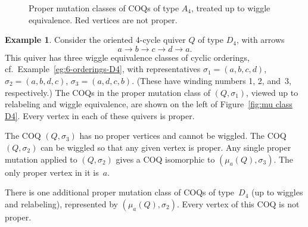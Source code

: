 \documentclass[11pt, letterpaper]{amsart}
\theoremstyle{definition}
\newtheorem{example}[theorem]{Example}
\numberwithin{equation}{section}
\begin{document}
\begin{figure}[ht]
{
}
\vspace{10pt}
\caption{Proper mutation classes of COQs of type $A_4$, treated up to wiggle equivalence. 
Red vertices are not proper.}
\label{fig:mu class A4}
\end{figure}

\vspace{-10pt}

\begin{example}
\label{eg:D4}
Consider the oriented 4-cycle quiver $Q$ of type $D_4$, with arrows 
\begin{equation*}
a \rightarrow b \rightarrow c \rightarrow d\rightarrow a. 
\end{equation*}
This quiver has three wiggle equivalence classes of cyclic orderings, cf.\ Example~\ref{eg:6-orderings-D4},
with representatives 
$\sigma_1=(a, b, c, d)$, $\sigma_2=(a,b,d,c)$, $\sigma_3=(a, d, c, b)$.
(These have winding numbers 1, 2, and~3, respectively.) 
The  COQs in the proper mutation class of $(Q,\sigma_1)$, 
viewed up to relabeling and wiggle equivalence, are shown on the left of Figure~\ref{fig:mu class D4}.
Every vertex in each of these quivers is proper.

The COQ $(Q,\sigma_3)$ has no proper vertices and cannot be wiggled.
The COQ $(Q,\sigma_2)$ can be wiggled so that any given vertex is proper. 
Any single proper mutation applied to $(Q,\sigma_2)$ gives a COQ isomorphic to $(\mu_a(Q),\sigma_3)$. 
The only proper vertex in it is~$a$.

There is one additional proper mutation class of COQs of type~$D_4$ (up to wiggles and relabeling), 
represented by $(\mu_a(Q),\sigma_2)$. 
Every vertex of this COQ is not proper.
\end{example}
\end{document}
